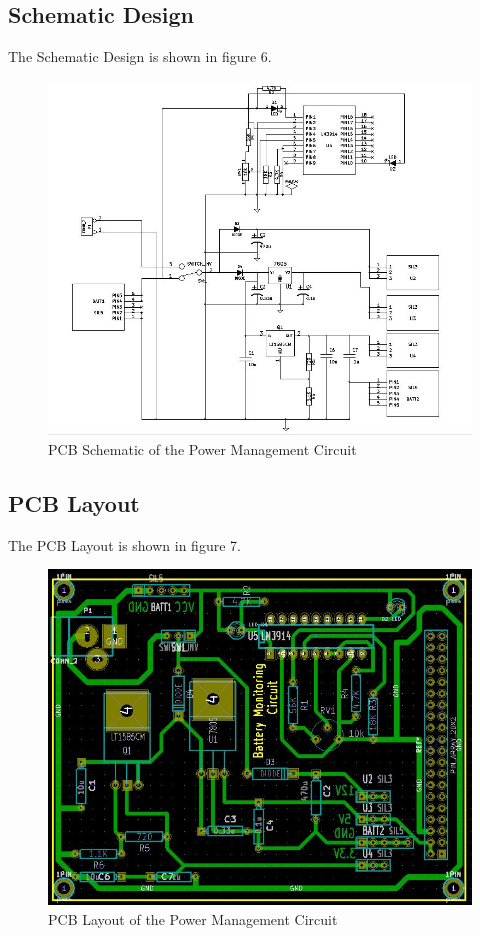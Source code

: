 \documentclass[11pt,a4paper]{article}
\begin{document}
	\subsection{Schematic Design}
	The Schematic Design is shown in figure 6.
		\begin{figure}[h!]
			\includegraphics[scale=0.5]{sch.jpg}
			\centering

			\caption{PCB Schematic of the Power Management Circuit}
		\end{figure}
	
	
		\subsection{PCB Layout}
			The PCB Layout is shown in figure 7.
		\begin{figure}[h!]
			\includegraphics[scale=0.5]{pcb.jpg}
			\centering
			
			\caption{PCB Layout of the Power Management Circuit}
		\end{figure}
		
\end{document}
